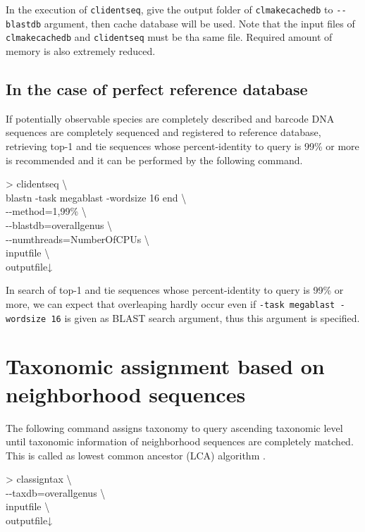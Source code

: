 \documentclass[titlepage,10pt,a4paper,english]{jsbook}
\newenvironment{cmd}{\begin{oframed}\raggedright\ttfamily\footnotesize\setlength{\baselineskip}{1.4em}}{\end{oframed}\vspace{-1em}}
\begin{document}
In the execution of \texttt{clidentseq}, give the output folder of \texttt{clmakecachedb} to \texttt{{-}{-}blastdb} argument, then cache database will be used.
Note that the input files of \texttt{clmakecachedb} and \texttt{clidentseq} must be tha same file.
Required amount of memory is also extremely reduced.

\subsection{In the case of perfect reference database}\label{subsection:completereferencedatabase}

If potentially observable species are completely described and barcode DNA sequences are completely sequenced and registered to reference database, retrieving top-1 and tie sequences whose percent-identity to query is 99\% or more is recommended and it can be performed by the following command.

\begin{cmd}
{\textgreater} clidentseq {\textbackslash}\\
blastn -task megablast -word{\textunderscore}size 16 end {\textbackslash}\\
{-}{-}method=1,99\% {\textbackslash}\\
{-}{-}blastdb=overall{\textunderscore}genus {\textbackslash}\\
{-}{-}numthreads=NumberOfCPUs {\textbackslash}\\
inputfile {\textbackslash}\\
outputfile↓
\end{cmd}

In search of top-1 and tie sequences whose percent-identity to query is 99\% or more, we can expect that overleaping hardly occur even if \texttt{-task megablast -word{\textunderscore}size 16} is given as BLAST search argument, thus this argument is specified.

\section{Taxonomic assignment based on neighborhood sequences}

The following command assigns taxonomy to query ascending taxonomic level until taxonomic information of neighborhood sequences are completely matched.
This is called as lowest common ancestor (LCA) algorithm \citep{Huson2007}.

\begin{cmd}
{\textgreater} classigntax {\textbackslash}\\
{-}{-}taxdb=overall{\textunderscore}genus {\textbackslash}\\
inputfile {\textbackslash}\\
outputfile↓
\end{cmd}
\end{document}
